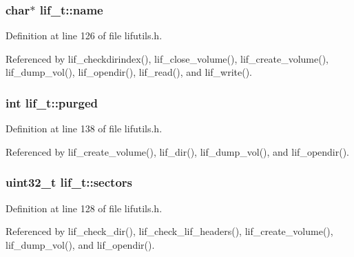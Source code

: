 \subsubsection[{\texorpdfstring{name}{name}}]{\setlength{\rightskip}{0pt plus 5cm}char$\ast$ lif\+\_\+t\+::name}\hypertarget{structlif__t_ae6b943f3c26005fc375169960e9049f7}{}\label{structlif__t_ae6b943f3c26005fc375169960e9049f7}


Definition at line 126 of file lifutils.\+h.



Referenced by lif\+\_\+checkdirindex(), lif\+\_\+close\+\_\+volume(), lif\+\_\+create\+\_\+volume(), lif\+\_\+dump\+\_\+vol(), lif\+\_\+opendir(), lif\+\_\+read(), and lif\+\_\+write().

\subsubsection[{\texorpdfstring{purged}{purged}}]{\setlength{\rightskip}{0pt plus 5cm}int lif\+\_\+t\+::purged}\hypertarget{structlif__t_a1dfef3ca99d6ba9680bb9b6bf8fafc32}{}\label{structlif__t_a1dfef3ca99d6ba9680bb9b6bf8fafc32}


Definition at line 138 of file lifutils.\+h.



Referenced by lif\+\_\+create\+\_\+volume(), lif\+\_\+dir(), lif\+\_\+dump\+\_\+vol(), and lif\+\_\+opendir().

\subsubsection[{\texorpdfstring{sectors}{sectors}}]{\setlength{\rightskip}{0pt plus 5cm}uint32\+\_\+t lif\+\_\+t\+::sectors}\hypertarget{structlif__t_a262b14d8547abff49d9dd1b445faf6d5}{}\label{structlif__t_a262b14d8547abff49d9dd1b445faf6d5}


Definition at line 128 of file lifutils.\+h.



Referenced by lif\+\_\+check\+\_\+dir(), lif\+\_\+check\+\_\+lif\+\_\+headers(), lif\+\_\+create\+\_\+volume(), lif\+\_\+dump\+\_\+vol(), and lif\+\_\+opendir().


